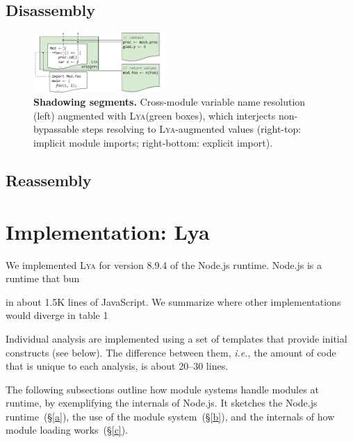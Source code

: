 \documentclass[letterpaper,twocolumn,10pt]{article}
\def\ie{{\em i.e.}, }
\newcommand{\sx}[1]{(\S\ref{#1})}
\newcommand{\sys}{{\scshape Lya}\xspace}
\begin{document}
\subsection{Disassembly}
\label{one}

\begin{figure}[t]
\centering 
\includegraphics[width=0.45\textwidth]{./figs/lya_shadowing.pdf}
\caption{
  \textbf{Shadowing segments.}
  \textmd{
  Cross-module variable name resolution (left) augmented with \sys (green boxes), which interjects non-bypassable steps resolving to \sys-augmented values (right-top: implicit module imports; right-bottom: explicit import).
  }
  \vspace{-4mm}
}
\label{fig:shadowing}
\end{figure}


\subsection{Reassembly}
\label{three}




\section{Implementation: Lya}
\label{impl}

We implemented \sys for version 8.9.4 of the Node.js runtime.
Node.js is a runtime that bun

in about 1.5K lines of JavaScript.
We summarize where other implementations would diverge in table 1

Individual analysis are implemented using a set of templates that provide initial constructs (see below).
The difference between them, \ie the amount of code that is unique to each analysis, is about 20--30 lines.

The following subsections outline how module systems handle modules at runtime, by exemplifying the internals of Node.js.
It sketches the Node.js runtime~\sx{a}, the use of the module system~\sx{b}, and the internals of how module loading works~\sx{c}.
\end{document}
